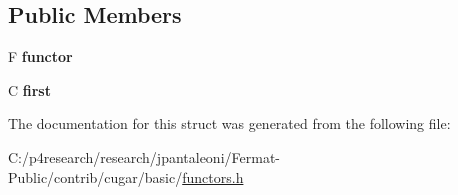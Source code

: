 \subsection*{Public Members}
\begin{DoxyCompactItemize}
\item 
\mbox{\label{structcugar_1_1binder1st_a49464ad5a5d5702d33cc9335923bdeb4}} 
F {\bfseries functor}
\item 
\mbox{\label{structcugar_1_1binder1st_a887b92e10090a4979ade76c005c2a79e}} 
C {\bfseries first}
\end{DoxyCompactItemize}


The documentation for this struct was generated from the following file\+:\begin{DoxyCompactItemize}
\item 
C\+:/p4research/research/jpantaleoni/\+Fermat-\/\+Public/contrib/cugar/basic/\hyperlink{functors_8h}{functors.\+h}\end{DoxyCompactItemize}
